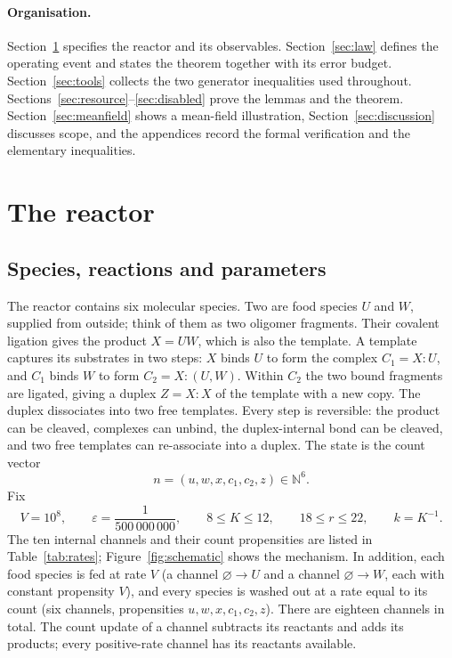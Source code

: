 \documentclass[11pt,a4paper]{article}
\theoremstyle{plain}
\theoremstyle{definition}
\theoremstyle{remark}
\newcommand{\N}{\mathbb N}
\newcommand{\eps}{\varepsilon}
\begin{document}
\paragraph{Organisation.}
Section~\ref{sec:model} specifies the reactor and its observables. Section~\ref{sec:law} defines the operating event and states the theorem together with its error budget. Section~\ref{sec:tools} collects the two generator inequalities used throughout. Sections~\ref{sec:resource}--\ref{sec:disabled} prove the lemmas and the theorem. Section~\ref{sec:meanfield} shows a mean-field illustration, Section~\ref{sec:discussion} discusses scope, and the appendices record the formal verification and the elementary inequalities.

\section{The reactor}\label{sec:model}

\subsection{Species, reactions and parameters}

The reactor contains six molecular species. Two are food species $U$ and $W$, supplied from outside; think of them as two oligomer fragments. Their covalent ligation gives the product $X=UW$, which is also the template. A template captures its substrates in two steps: $X$ binds $U$ to form the complex $C_1=X{:}U$, and $C_1$ binds $W$ to form $C_2=X{:}(U,W)$. Within $C_2$ the two bound fragments are ligated, giving a duplex $Z=X{:}X$ of the template with a new copy. The duplex dissociates into two free templates. Every step is reversible: the product can be cleaved, complexes can unbind, the duplex-internal bond can be cleaved, and two free templates can re-associate into a duplex. The state is the count vector
\[
n=(u,w,x,c_1,c_2,z)\in\N^6 .
\]
Fix
\begin{equation}\label{eq:parameters}
V=10^8,\qquad \eps=\frac1{500\,000\,000},\qquad 8\le K\le 12,\qquad 18\le r\le 22,\qquad k=K^{-1}.
\end{equation}
The ten internal channels and their count propensities are listed in Table~\ref{tab:rates}; Figure~\ref{fig:schematic} shows the mechanism. In addition, each food species is fed at rate $V$ (a channel $\varnothing\to U$ and a channel $\varnothing\to W$, each with constant propensity $V$), and every species is washed out at a rate equal to its count (six channels, propensities $u,w,x,c_1,c_2,z$). There are eighteen channels in total. The count update of a channel subtracts its reactants and adds its products; every positive-rate channel has its reactants available.
\end{document}

